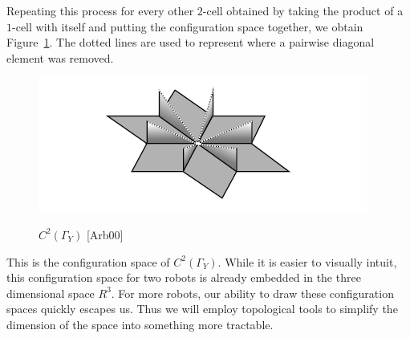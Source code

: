 \documentclass{amsart}
\newcommand{\Y}{\Gamma_Y}
\begin{document}
Repeating this process for every other $2$-cell obtained by taking the product of a $1$-cell with itself and putting the configuration space together, we obtain Figure~\ref{fig:config}. The dotted lines are used to represent where a pairwise diagonal element was removed.

\begin{figure}[h]
\centering
\caption{$C^2(\Y)$ [Arb00]}
\includegraphics[scale=1]{Presentation/Config.jpg}
\label{fig:config}
\end{figure}

This is the configuration space of $C^2(\Y)$. While it is easier to visually intuit, this configuration space for two robots is already embedded in the three dimensional space $R^3$. For more robots, our ability to draw these configuration spaces quickly escapes us. Thus we will employ topological tools to simplify the dimension of the space into something more tractable.
\end{document}
